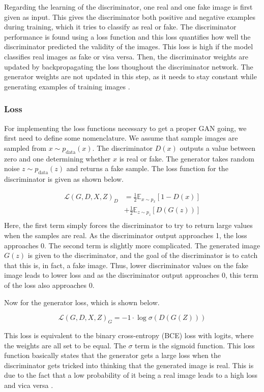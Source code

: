 \documentclass[11pt, fleqn, titlepage]{article}
\newcommand{\1}[1]{\mathds{1}\left[#1\right]}
\begin{document}
Regarding the learning of the discriminator, one real and one fake image is first given as input. This gives the discriminator both positive and negative examples during training, which it tries to classify as real or fake. The discriminator performance is found using a loss function and this loss quantifies how well the discriminator predicted the validity of the images. This loss is high if the model classifies real images as fake or visa versa. Then, the discriminator weights are updated by backpropagating the loss thoughout the discriminator network. The generator weights are not updated in this step, as it needs to stay constant while generating examples of training images \cite{developers.google_discriminator, developers.google_training}.

\subsubsection{Loss}
For implementing the loss functions necessary to get a proper GAN going, we first need to define some nomenclature. We assume that sample images are sampled from $x \sim p_{\text {data}}(x)$. The discriminator $D(x)$ outputs a value between zero and one determining whether $x$ is real or fake. The generator takes random noise $z \sim p_{\text {data}}(z)$ and returns a fake sample. The loss function for the discriminator is given as shown below.

\[\begin{aligned}
	\mathcal{L}\left(G, D, X, Z\right)_D &=\frac{1}{2} \mathbb{E}_{x \sim p_{x}}[1-D(x)] \\
	&+\frac{1}{2} \mathbb{E}_{z \sim p_{z}}[D(G(z))] \\
\end{aligned}\]
Here, the first term simply forces the discriminator to try to return large values when the samples are real. As the discriminator output approaches 1, the loss approaches 0. The second term is slightly more complicated. The generated image $G(z)$ is given to the discriminator, and the goal of the discriminator is to catch that this is, in fact, a fake image. Thus, lower discriminator values on the fake image leads to lower loss and as the discriminator output approaches 0, this term of the loss also approaches 0.

Now for the generator loss, which is shown below.

\[\mathcal{L}\left(G, D, X, Z\right)_G=-1 \cdot \log \sigma\left(D(G(Z))\right)\]

This loss is equivalent to the binary cross-entropy (BCE) loss with logits, where the weights are all set to be equal. The $\sigma$ term is the sigmoid function. This loss function basically states that the generator gets a large loss when the discriminator gets tricked into thinking that the generated image is real. This is due to the fact that a low probability of it being a real image leads to a high loss and vica versa \cite{bcewithlogits}.
\end{document}
